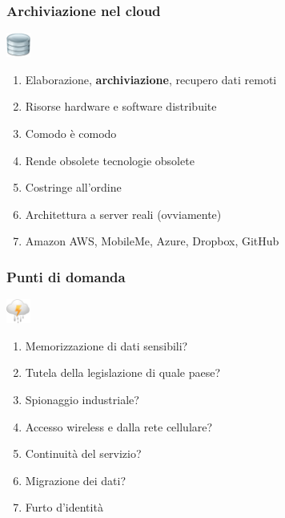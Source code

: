 \documentclass[xcolor=svgnames,handout]{beamer}
\begin{document}
\begin{frame}
	\frametitle{Archiviazione nel cloud}

	\begin{block}{\includegraphics[width=30px]{img/storage.png}}
			\begin{enumerate}
					\item Elaborazione, {\bf archiviazione}, recupero dati remoti
						\pause
					\item Risorse hardware e software distribuite
						\pause
					\item Comodo è comodo
						\pause
					\item Rende obsolete tecnologie obsolete
						\pause
					\item Costringe all'ordine
						\pause
					\item Architettura a server reali (ovviamente)
						\pause
					\item Amazon AWS, MobileMe, Azure, Dropbox, GitHub
			\end{enumerate}
	\end{block}
\end{frame}

\begin{frame}
	\frametitle{Punti di domanda}

	\begin{block}{\includegraphics[width=30px]{img/cloud.png}}
			\begin{enumerate}
					\item Memorizzazione di dati sensibili?
						\pause
					\item Tutela della legislazione di quale paese?
						\pause
					\item Spionaggio industriale?
						\pause
					\item Accesso wireless e dalla rete cellulare?
						\pause
					\item Continuità del servizio?
						\pause
					\item Migrazione dei dati?
						\pause
					\item Furto d'identità
			\end{enumerate}
	\end{block}
\end{frame}
\end{document}
